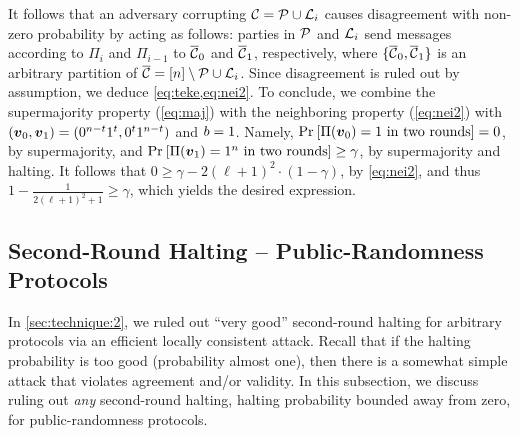 
It follows that an adversary corrupting $\mathcal{C}=\mathcal{P} \cup {\cal{L}}_i$ causes disagreement with non-zero probability by acting as follows: parties in $\mathcal{P}$ and ${\cal{L}}_i$ send messages according to $\Pi_i$ and $\Pi_{i-1}$ to $\overline{\mathcal{C}}_0$ and $\overline{\mathcal{C}}_1$, respectively, where $\{\overline{\mathcal{C}}_0,\overline{\mathcal{C}}_1\}$ is an arbitrary partition of $\overline{\mathcal{C}}= [n]\setminus \mathcal{P}\cup {\cal{L}}_i$. Since disagreement is ruled out by assumption, we deduce \cref{eq:teke,eq:nei2}. To conclude, we combine the supermajority property (\cref{eq:maj}) with the neighboring property (\cref{eq:nei2}) with $({ \boldsymbol{v}}_0,{ \boldsymbol{v}}_1)=(0^{n-t}1^{t}, 0^{t}1^{n-t})$ and $b=1$. Namely, $\Pr_{}\left[\Pi({ \boldsymbol{v}}_0)=1\text{ in two rounds}\right]=0$, by supermajority, and $\Pr_{}\left[\Pi({ \boldsymbol{v}}_1)=1^n\text{ in two rounds}\right]\ge\gamma$, by supermajority and halting. It follows that $ 0 \ge \gamma - 2  (\ell +1  )^2  \cdot (1-\gamma)$, by \cref{eq:nei2}, and thus $1-\frac{1}{2(\ell+1)^2+1} \ge \gamma$, which yields the desired expression.


\ifdefined\IsFullVersion\else
\vspace{-.2cm}
\fi
\subsection{Second-Round Halting -- Public-Randomness  Protocols}\label{sec:technique:3}

In \cref{sec:technique:2}, we ruled out ``very good'' second-round halting for arbitrary protocols via an efficient locally consistent attack. Recall that if the halting probability is too good (probability almost one), then there is a somewhat simple attack that violates agreement and/or validity. In this subsection, we discuss ruling out \emph{any} second-round halting, \ie halting probability bounded away from zero, for public-randomness protocols.

